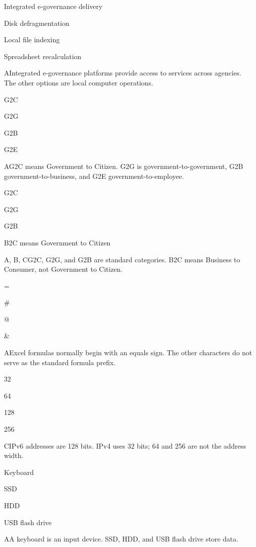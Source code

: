 \begin{enumerate}[label=\textbf{Q\arabic*.}, leftmargin=*]
  {\item Integrated e-governance delivery
   \item Disk defragmentation
   \item Local file indexing
   \item Spreadsheet recalculation}
  {A}{Integrated e-governance platforms provide access to services across agencies. The other options are local computer operations.}
  {\item G2C
   \item G2G
   \item G2B
   \item G2E}
  {A}{G2C means Government to Citizen. G2G is government-to-government, G2B government-to-business, and G2E government-to-employee.}
  {\item G2C
   \item G2G
   \item G2B
   \item B2C means Government to Citizen}
  {A, B, C}{G2C, G2G, and G2B are standard categories. B2C means Business to Consumer, not Government to Citizen.}
\fi
\ifnum{}
  {\item =
   \item \#
   \item @
   \item \&}
  {A}{Excel formulas normally begin with an equals sign. The other characters do not serve as the standard formula prefix.}
  {\item 32
   \item 64
   \item 128
   \item 256}
  {C}{IPv6 addresses are 128 bits. IPv4 uses 32 bits; 64 and 256 are not the address width.}
  {\item Keyboard
   \item SSD
   \item HDD
   \item USB flash drive}
  {A}{A keyboard is an input device. SSD, HDD, and USB flash drive store data.}

\end{enumerate}
